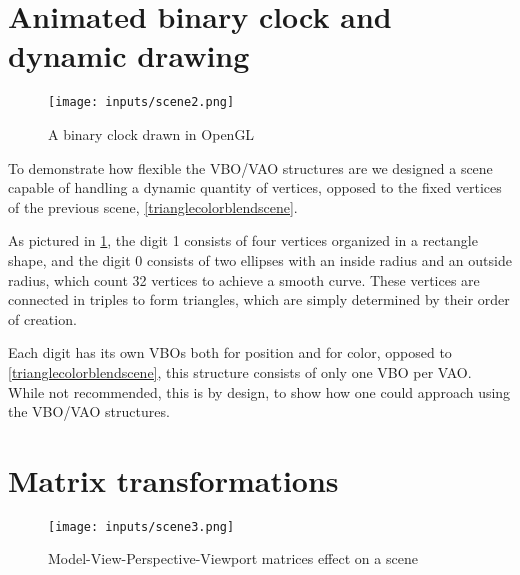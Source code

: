 \documentclass[cic,tc,english]{iiufrgs}
\begin{document}
%
\section{Animated binary clock and dynamic drawing}
\begin{figure}[h!]
    \caption{A binary clock drawn in OpenGL}
    \begin{center}
        \texttt{[image: inputs/scene2.png]}
    \end{center}
    \label{binaryclock}
\end{figure}

To demonstrate how flexible the VBO/VAO structures are we designed a scene capable of handling a dynamic quantity of vertices, opposed to the fixed vertices of the previous scene, \cref{trianglecolorblendscene}.

As pictured in  \cref{binaryclock}, the digit 1 consists of four vertices organized in a rectangle shape, and the digit 0 consists of two ellipses with an inside radius and an outside radius, which count 32 vertices to achieve a smooth curve. These vertices are connected in triples to form triangles, which are simply determined by their order of creation.

Each digit has its own VBOs both for position and for color, opposed to \cref{trianglecolorblendscene}, this structure consists of only one VBO per VAO. While not recommended, this is by design, to show how one could approach using the VBO/VAO structures.
%

\section{Matrix transformations}
\label{matrixtransformationscene}

\begin{figure}[t!]
    \caption{Model-View-Perspective-Viewport matrices effect on a scene}
    \begin{center}
        \texttt{[image: inputs/scene3.png]}
    \end{center}
    \label{pointmvpvscene}
\end{figure}
\end{document}
